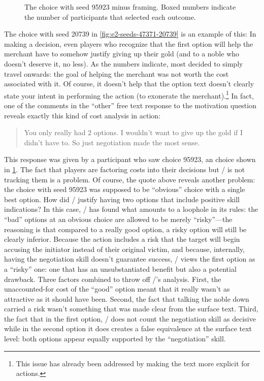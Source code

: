 \begin{figure}[!b]
\caption[``Obvious failure'' choice 95923]{The \obvf{} choice with seed 95923 minus framing. Boxed numbers indicate the number of participants that selected each outcome.}
\label{fig:e2-seed-95923}
\end{figure}


The choice with seed 20739 in \cref{fig:e2-seeds-47371-20739} is an example of this: In making a decision, even players who recognize that the first option will help the merchant have to somehow justify giving up their gold (and to a noble who doesn't deserve it, no less).
%
As the numbers indicate, most decided to simply travel onwards: the goal of helping the merchant was not worth the cost associated with it.
%
Of course, it doesn't help that the option text doesn't clearly state your intent in performing the action (to exonerate the merchant).\footnote{This issue has already been addressed by making the text more explicit for  actions.}
%
In fact, one of the comments in the ``other'' free text response to the motivation question reveals exactly this kind of cost analysis in action:

\begin{quote}
  \quoteshape
You only really had 2 options. I wouldn't want to give up the gold if I didn't have to. So just negotiation made the most sense.
\end{quote}

This response was given by a participant who saw choice 95923, an \obvf{} choice shown in \cref{fig:e2-seed-95923}.
%
The fact that players are factoring costs into their decisions but \dunyazad/ is not tracking them is a problem.
%
Of course, the quote above reveals another problem: the choice with seed 95923 was supposed to be ``obvious'' choice with a single best option.
%
How did \dunyazad/ justify having two options that include positive skill indications?
%
In this case, \dunyazad/ has found what amounts to a loophole in its rules: the ``bad'' options at an obvious choice are allowed to be merely ``risky''---the reasoning is that compared to a really good option, a risky option will still be clearly inferior.
%
Because the  action includes a risk that the target will begin accusing the initiator instead of their original victim, and because, internally, having the negotiation skill doesn't guarantee success, \dunyazad/ views the first option as a ``risky'' one: one that has an unsubstantiated benefit but also a potential drawback.
%
Three factors combined to throw off \dunyazad/'s analysis.
%
First, the unaccounted-for cost of the ``good'' option meant that it really wasn't as attractive as it should have been.
%
Second, the fact that talking the noble down carried a risk wasn't something that was made clear from the surface text.
%
Third, the fact that in the first option, \dunyazad/ does not count the negotiation skill as decisive while in the second option it does creates a false equivalence at the surface text level: both options appear equally supported by the ``negotiation'' skill.


